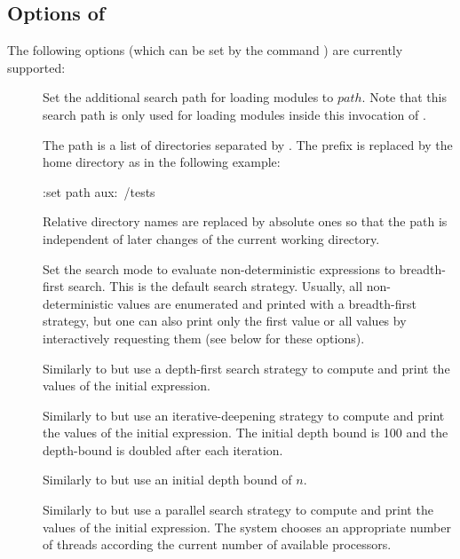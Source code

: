 \subsection{Options of \CYS}
\label{sec:options}

The following options (which can be set by the command )
are currently supported:

\begin{description}
\item[] Set the additional search path
for loading modules to $path$.
Note that this search path is only used for loading modules
inside this invocation of \CYS.

The path is a list of directories separated by \ccode{:}.
The prefix  is replaced by the home directory as
in the following example:
\begin{curry}
:set path aux:~/tests
\end{curry}
Relative directory names are replaced by absolute ones
so that the path is independent of later changes of the
current working directory.

\item[]
Set the search mode to evaluate non-deterministic expressions
to breadth-first search.
This is the default search strategy.
Usually, all non-deterministic values
are enumerated and printed with a breadth-first strategy, but one can also
print only the first value or all values by interactively requesting them
(see below for these options).

\item[]
Similarly to  but use a depth-first search strategy
to compute and print the values of the initial expression.

\item[]
Similarly to  but use an iterative-deepening strategy
to compute and print the values of the initial expression.
The initial depth bound is 100 and the depth-bound is
doubled after each iteration.

\item[]
Similarly to  but use an initial depth bound of $n$.

\item[]
Similarly to  but use a parallel search strategy
to compute and print the values of the initial expression.
The system chooses an appropriate number
of threads according the current number of available processors.


\end{description}
